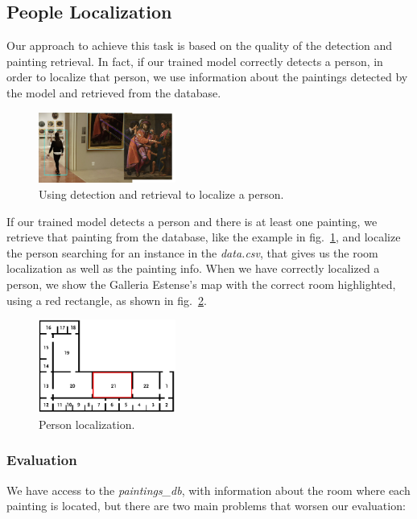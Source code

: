 \subsection{People Localization}
Our approach to achieve this task is based on the quality of the detection and painting retrieval. In fact, if our trained model correctly detects a person, in order to localize that person, we use information about the paintings detected by the model and retrieved from the database.

\begin{figure}[h!]
    \centering
    \includegraphics[width=0.4\textwidth]{pictures/people_localization/localization}
    \caption{Using detection and retrieval to localize a person.}
    \label{fig:localization}
\end{figure}

If our trained model detects a person and there is at least one painting, we retrieve that painting from the database, like the example in fig.~\ref{fig:localization}, and localize the person searching for an instance in the \emph{data.csv}, that gives us the room localization as well as the painting info.
When we have correctly localized a person, we show the Galleria Estense's map with the correct room highlighted, using a red rectangle, as shown in fig.~\ref{fig:localization_result}.

\begin{figure}[h!]
    \centering
    \includegraphics[width=0.4\textwidth]{pictures/people_localization/localization_result}
    \caption{Person localization.}
    \label{fig:localization_result}
\end{figure}



\subsubsection{Evaluation}
We have access to the \emph{paintings\_db}, with information about the room where each painting is located, but there are two main problems that worsen our evaluation:


